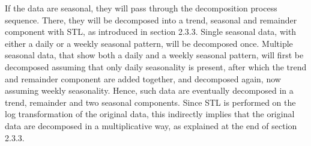\documentclass[12pt,oneside]{reedthesis}
\begin{document}
If the data are seasonal, they will pass through the decomposition
process sequence. There, they will be decomposed into a trend, seasonal
and remainder component with STL, as introduced in section 2.3.3. Single
seasonal data, with either a daily or a weekly seasonal pattern, will be
decomposed once. Multiple seasonal data, that show both a daily and a
weekly seasonal pattern, will first be decomposed assuming that only
daily seasonality is present, after which the trend and remainder
component are added together, and decomposed again, now assuming weekly
seasonality. Hence, such data are eventually decomposed in a trend,
remainder and two seasonal components. Since STL is performed on the log
transformation of the original data, this indirectly implies that the
original data are decomposed in a multiplicative way, as explained at
the end of section 2.3.3.
\end{document}
